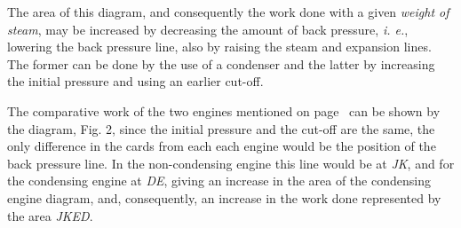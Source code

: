 \documentclass[11pt, a5paper]{book}
\begin{document}
The area of this diagram, and consequently the work done with a given
\textit{weight of steam}, may be increased by decreasing the amount of
back pressure, \textit{i. e.}, lowering the back pressure line, also
by raising the steam and expansion lines.  The former can be done by
the use of a condenser and the latter by increasing the initial
pressure and using an earlier cut-off.\par

The comparative work of the two engines mentioned on
page~\pageref{cond_non-cond} can be shown by the diagram, Fig. 2,
since the initial pressure and the cut-off are the same, the only
difference in the cards from each each engine would be the position of
the back pressure line.  In the non-condensing engine this line would
be at \textit{JK}, and for the condensing engine at \textit{DE},
giving an increase in the area of the condensing engine diagram, and,
consequently, an increase in the work done represented by the area
\textit{JKED}.\par
\end{document}
